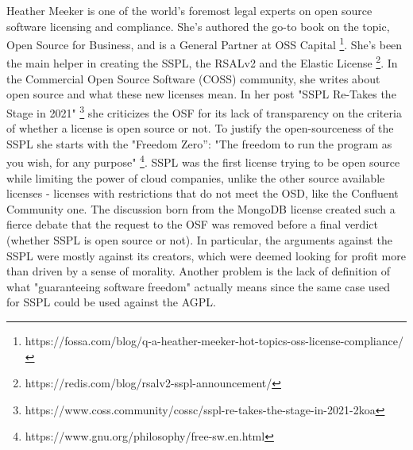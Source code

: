 \documentclass[12pt, a4paper]{article}
\begin{document}
  Heather Meeker is one of the world's foremost legal experts on open source software licensing and compliance. She's authored the go-to book on the topic, Open Source for Business, and is a General Partner at OSS Capital \footnote{https://fossa.com/blog/q-a-heather-meeker-hot-topics-oss-license-compliance/}. She's been the main helper in creating the SSPL, the RSALv2 and the Elastic License \footnote{https://redis.com/blog/rsalv2-sspl-announcement/}. In the Commercial Open Source Software (COSS) community, she writes about open source and what these new licenses mean. In her post "SSPL Re-Takes the Stage in 2021" \footnote{https://www.coss.community/cossc/sspl-re-takes-the-stage-in-2021-2koa} she criticizes the OSF for its lack of transparency on the criteria of whether a license is open source or not. To justify the open-sourceness of the SSPL she starts with the "Freedom Zero”: "The freedom to run the program as you wish, for any purpose" \footnote{https://www.gnu.org/philosophy/free-sw.en.html}. SSPL was the first license trying to be open source while limiting the power of cloud companies, unlike the other source available licenses - licenses with restrictions that do not meet the OSD, like the Confluent Community one. The discussion born from the MongoDB license created such a fierce debate that the request to the OSF was removed before a final verdict (whether SSPL is open source or not). In particular, the arguments against the SSPL were mostly against its creators, which were deemed looking for profit more than driven by a sense of morality. Another problem is the lack of definition of what "guaranteeing software freedom" actually means since the same case used for SSPL could be used against the AGPL.


\end{document}
